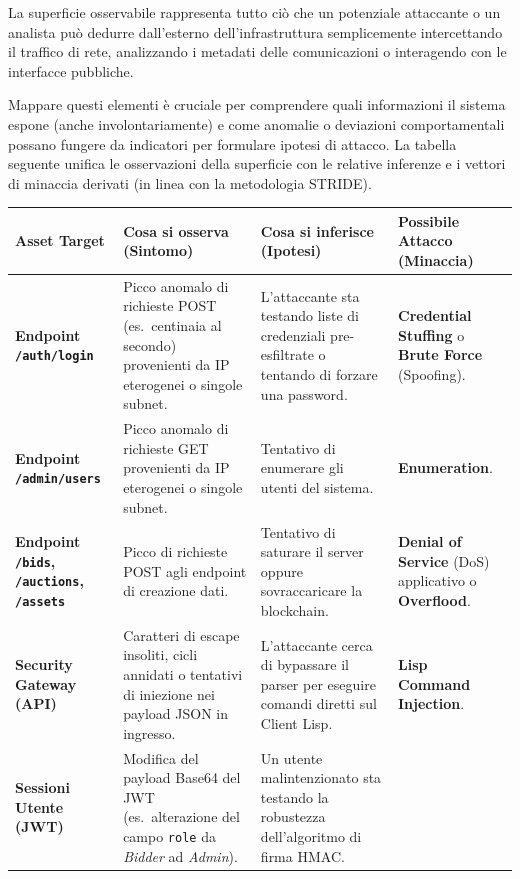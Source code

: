 La superficie osservabile rappresenta tutto ciò che un potenziale attaccante o un analista può dedurre dall'esterno dell'infrastruttura semplicemente intercettando il traffico di rete, analizzando i metadati delle comunicazioni o interagendo con le interfacce pubbliche.

Mappare questi elementi è cruciale per comprendere quali informazioni il sistema espone (anche involontariamente) e come anomalie o deviazioni comportamentali possano fungere da indicatori per formulare ipotesi di attacco. La tabella seguente unifica le osservazioni della superficie con le relative inferenze e i vettori di minaccia derivati (in linea con la metodologia STRIDE).

\begin{table}[h]
\centering
\footnotesize
\renewcommand{\arraystretch}{1.5}
\begin{tabularx}{\textwidth}{>{\bfseries}p{2.5cm} X X X}
\toprule
\textbf{Asset Target} & \textbf{Cosa si osserva (Sintomo)} & \textbf{Cosa si inferisce (Ipotesi)} & \textbf{Possibile Attacco (Minaccia)} \\
\midrule
Endpoint \texttt{/auth/login} &
    Picco anomalo di richieste POST (es.\ centinaia al secondo) provenienti da IP eterogenei
    o singole subnet. &
    L'attaccante sta testando liste di credenziali pre-esfiltrate o tentando di forzare
    una password. &
    \textbf{Credential Stuffing} o \textbf{Brute Force} (Spoofing). \\[4pt]
Endpoint \texttt{/admin/users} &
    Picco anomalo di richieste GET provenienti da IP eterogenei o singole subnet. &
    Tentativo di enumerare gli utenti del sistema. &
    \textbf{Enumeration}. \\[4pt]
Endpoint \texttt{/bids}, \texttt{/auctions}, \texttt{/assets} &
    Picco di richieste POST agli endpoint di creazione dati. &
    Tentativo di saturare il server oppure sovraccaricare la blockchain. &
    \textbf{Denial of Service} (DoS) applicativo o \textbf{Overflood}. \\[4pt]
Security Gateway (API) &
    Caratteri di escape insoliti, cicli annidati o tentativi di iniezione nei payload JSON
    in ingresso. &
    L'attaccante cerca di bypassare il parser per eseguire comandi diretti sul Client Lisp. &
    \textbf{Lisp Command Injection}. \\[4pt]
Sessioni Utente (JWT) &
    Modifica del payload Base64 del JWT (es.\ alterazione del campo \texttt{role} da
    \textit{Bidder} ad \textit{Admin}). &
    Un utente malintenzionato sta testando la robustezza dell'algoritmo di firma HMAC. &

\end{tabularx}
\end{table}
